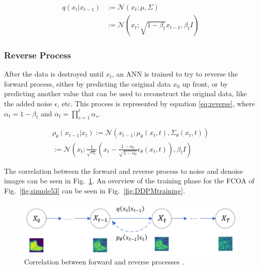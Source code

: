 \documentclass[conference]{IEEEtran}
\begin{document}
	\begin{equation} \label{eq:forward}
	\begin{aligned}
	q(x_{t}|x_{t-1}) &:= \mathcal{N}(x_{t};\mu,\Sigma) \\ &:= \mathcal{N}(x_{t};\sqrt{1-\beta_{t}}x_{t-1}, \beta_{t}I)
	\end{aligned}
	\end{equation}
	
	\subsubsection{Reverse Process}
	After the data is destroyed until $x_{t}$, an ANN is trained to try to reverse the forward process, either by predicting the original data $x_{0}$ up front, or by predicting another value that can be used to reconstruct the original data, like the added noise $\epsilon$, etc. This process is represented by equation \ref{eq:reverse}, where $\alpha_{t}=1-\beta_{t}$ and $\overline{\alpha}_{t}=\prod_{s=1}^{t}\alpha_{s}$.
	
	\begin{equation} \label{eq:reverse}
	\begin{split}
		\rho_{\theta}(x_{t-1}|x_{t}) := \mathcal{N}(x_{t-1};\mu_{\theta}(x_{t},t),\Sigma_{\theta}(x_{t},t)) \\:= \mathcal{N}(x_{t};\frac{1}{\sqrt{\alpha_{t}}}(x_{t}-\frac{1-\alpha_{t}}{\sqrt{1-\overline{\alpha}_{t}}}\epsilon_{\theta}(x_{t},t)),\beta_{t}I) 
	\end{split}
	\end{equation}
	
	The correlation between the forward and reverse process to noise and denoise images can be seen in Fig.~\ref{fig:forward_reverse}. An overview of the training phase for the FCOA of Fig.~\ref{fig:simple53} can be seen in Fig.~\ref{fig:DDPMtraining}.
	
	\begin{figure}[h]
		\centering
		\includegraphics[width=\linewidth]{figures/ForwardReverseDDPM}
		\setlength{\abovecaptionskip}{0ex}%
		\setlength{\belowcaptionskip}{-2ex}%
		\caption{Correlation between forward and reverse processes \cite{eid24diffusion}.}
		\label{fig:forward_reverse}
	\end{figure}
	
\end{document}
